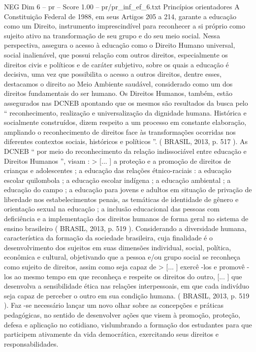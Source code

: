 \begin{textsample}{NEG Dim 6 – pr – Score 1.00 – pr/pr\_inf\_ef\_6.txt}  \label{ex:f6_neg_270}
Princípios orientadores A Constituição Federal de 1988, em seus Artigos 205 a 214, garante a educação como um Direito, instrumento imprescindível para reconhecer a si próprio como sujeito ativo na transformação de seu grupo e do seu meio social.
Nessa perspectiva, assegura o acesso à educação como o Direito Humano universal, social inalienável, que possui relação com outros direitos, especialmente os direitos civis e políticos e de caráter subjetivo, sobre os quais a educação é decisiva, uma vez que possibilita o acesso a outros direitos, dentre esses, destacamos o direito ao Meio Ambiente saudável, considerado como um dos direitos fundamentais do ser humano.
Os Direitos Humanos, também, estão assegurados nas DCNEB apontando que os mesmos são resultados da busca pelo “ reconhecimento, realização e universalização da dignidade humana.
Histórica e socialmente construídos, dizem respeito a um processo em constante elaboração, ampliando o reconhecimento de direitos face às transformações ocorridas nos diferentes contextos sociais, históricos e políticos ”. ( BRASIL, 2013, p. 517 ).
As DCNEB “ por meio do reconhecimento da relação indissociável entre educação e Direitos Humanos ”, visam : > [... ] a proteção e a promoção de direitos de crianças e adolescentes ; a educação das relações étnico-raciais : a educação escolar quilombola ; a educação escolar indígena ; a educação ambiental ; a educação do campo ; a educação para jovens e adultos em situação de privação de liberdade nos estabelecimentos penais, as temáticas de identidade de gênero e orientação sexual na educação ; a inclusão educacional das pessoas com deficiência e a implementação dos direitos humanos de forma geral no sistema de ensino brasileiro ( BRASIL, 2013, p. 519 ).
Considerando a diversidade humana, característica da formação da sociedade brasileira, cuja finalidade é o desenvolvimento dos sujeitos em suas dimensões individual, social, política, econômica e cultural, objetivando que a pessoa e/ou grupo social se reconheça como sujeito de direitos, assim como seja capaz de > [... ] exercê -los e promovê -los ao mesmo tempo em que reconheça e respeite os direitos do outro, [... ] que desenvolva a sensibilidade ética nas relações interpessoais, em que cada indivíduo seja capaz de perceber o outro em sua condição humana. ( BRASIL, 2013, p. 519 ).
Faz -se necessário lançar um novo olhar sobre as concepções e práticas pedagógicas, no sentido de desenvolver ações que visem à promoção, proteção, defesa e aplicação no cotidiano, vislumbrando a formação dos estudantes para que participem ativamente da vida democrática, exercitando seus direitos e responsabilidades.

\end{textsample}

